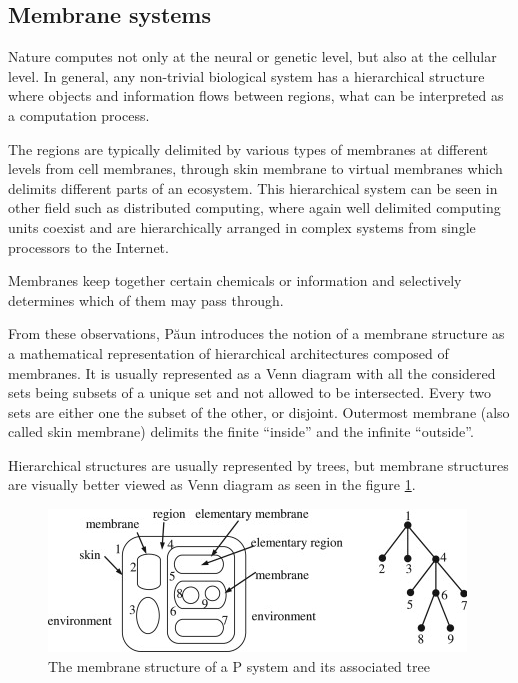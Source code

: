 


\subsection{Membrane systems} %
\label{sub:membrane_systems}

Nature computes not only at the neural or genetic level, but also at the cellular level. In general, any non-trivial biological system has a hierarchical structure where objects and information flows between regions, what can be interpreted as a computation process.

The regions are typically delimited by various types of membranes at different levels from  cell membranes, through skin membrane to virtual membranes which delimits different parts of an ecosystem.
This hierarchical system can be seen in other field such as distributed computing, where again well delimited computing units coexist and are hierarchically arranged in complex systems from single processors to the Internet.

Membranes keep together certain chemicals or information and selectively determines which of them may pass through.


From these observations, P\u{a}un \cite{Paun98} introduces the notion of a  membrane structure as a mathematical representation of hierarchical architectures composed of membranes. It is usually represented as a Venn diagram with all the considered sets being subsets of a unique set and not allowed to be intersected. Every two sets are either one the subset of the other, or disjoint. Outermost membrane (also called skin membrane) delimits the finite ``inside'' and the infinite ``outside''.

Hierarchical structures are usually represented by trees, but membrane structures are visually better viewed as Venn diagram as seen in the figure \ref{fig:membrane_structure}.

\begin{figure}
  \centering
  \includegraphics{img/membrane_structure.jpg}
  \caption{The membrane structure of a P system and its associated tree \cite{Zhang20101997AnalyzingRadarSignalsWithMembrane}}
  \label{fig:membrane_structure}
\end{figure}

